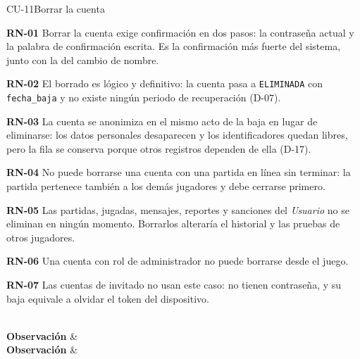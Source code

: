 \begin{fichacu}{CU-11}{Borrar la cuenta}
{\begin{cureglas}
      \item \textbf{\mbox{RN-01}} Borrar la cuenta exige confirmación en dos pasos: la contraseña actual y la palabra de confirmación escrita. Es la confirmación más fuerte del sistema, junto con la del cambio de nombre.
      \item \textbf{\mbox{RN-02}} El borrado es lógico y definitivo: la cuenta pasa a \texttt{ELIMINADA} con \texttt{fecha\_\allowbreak{}baja} y no existe ningún periodo de recuperación (\mbox{D-07}).
      \item \textbf{\mbox{RN-03}} La cuenta se anonimiza en el mismo acto de la baja en lugar de eliminarse: los datos personales desaparecen y los identificadores quedan libres, pero la fila se conserva porque otros registros dependen de ella (\mbox{D-17}).
      \item \textbf{\mbox{RN-04}} No puede borrarse una cuenta con una partida en línea sin terminar: la partida pertenece también a los demás jugadores y debe cerrarse primero.
      \item \textbf{\mbox{RN-05}} Las partidas, jugadas, mensajes, reportes y sanciones del \textit{Usuario} no se eliminan en ningún momento. Borrarlos alteraría el historial y las pruebas de otros jugadores.
      \item \textbf{\mbox{RN-06}} Una cuenta con rol de administrador no puede borrarse desde el juego.
      \item \textbf{\mbox{RN-07}} Las cuentas de invitado no usan este caso: no tienen contraseña, y su baja equivale a olvidar el token del dispositivo.
    \end{cureglas}} \\ \hline
  \textbf{Observación} &  \\ \hline
  \textbf{Observación} & 
\end{fichacu}
